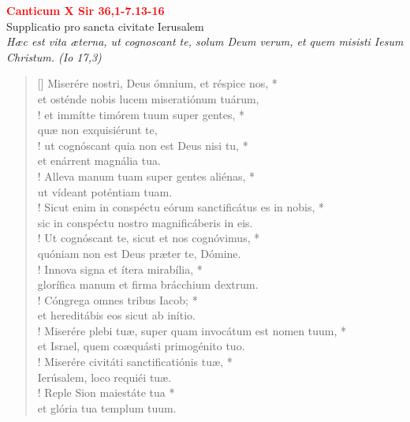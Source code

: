


\def\greinitialformat#1{%
{\fontsize{39}{39}\selectfont #1}%
}




\vspace{0.3cm}
\begin{center}
 \textcolor{red}{\large \bf Canticum X Sir 36,1-7.13-16}\\
Supplicatio pro sancta civitate Ierusalem\\
\textit{\small Hæc est vita æterna, ut cognoscant te, solum Deum verum, et quem misisti Iesum Christum. (Io 17,3)}
\end{center}
\begin{verse}[\versewidth]
Miserére nostri, Deus ómnium, et réspice nos, *\\
et osténde nobis lucem miseratiónum tuárum,\\!
\vin et immítte timórem tuum super gentes, *\\
\vin quæ non exquisiérunt te,\\!
ut cognóscant quia non est Deus nisi tu, *\\
et enárrent magnália tua.\\!
\vin Alleva manum tuam super gentes aliénas, *\\
\vin ut vídeant poténtiam tuam.\\!
Sicut enim in conspéctu eórum sanctificátus es in nobis, *\\
sic in conspéctu nostro magnificáberis in eis.\\!
\vin Ut cognóscant te, sicut et nos cognóvimus, *\\
\vin quóniam non est Deus præter te, Dómine.\\!
Innova signa et ítera mirabília, *\\
glorífica manum et firma brácchium dextrum.\\!
\vin Cóngrega omnes tribus Iacob; *\\
\vin et hereditábis eos sicut ab inítio.\\!
Miserére plebi tuæ, super quam invocátum est nomen tuum, *\\
et Israel, quem coæquásti primogénito tuo.\\!
\vin Miserére civitáti sanctificatiónis tuæ, *\\
\vin Ierúsalem, loco requiéi tuæ.\\!
Reple Sion maiestáte tua *\\
et glória tua templum tuum.\\
\end{verse}
\vspace{1cm}


